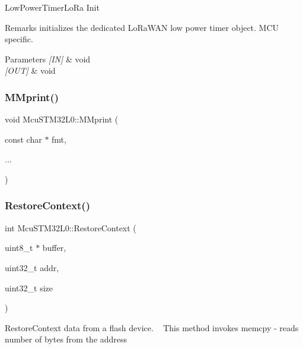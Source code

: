 Low\+Power\+Timer\+Lo\+Ra Init \begin{DoxyRemark}{Remarks}
initializes the dedicated Lo\+Ra\+W\+AN low power timer object. M\+CU specific. 
\end{DoxyRemark}

\begin{DoxyParams}{Parameters}
{\em \mbox{[}\+I\+N\mbox{]}} & void \\
\hline
{\em \mbox{[}\+O\+U\+T\mbox{]}} & void \\
\hline
\end{DoxyParams}
\mbox{\label{class_mcu_s_t_m32_l0_a23c56a6c3f82d731a344793288b2c998}} 
\subsubsection{\texorpdfstring{M\+Mprint()}{MMprint()}}
{\footnotesize\ttfamily void Mcu\+S\+T\+M32\+L0\+::\+M\+Mprint (\begin{DoxyParamCaption}\item[{const char $\ast$}]{fmt,  }\item[{}]{... }\end{DoxyParamCaption})}

\mbox{\label{class_mcu_s_t_m32_l0_a96a84f57ee2a60edb900505b8c23cf19}} 
\subsubsection{\texorpdfstring{Restore\+Context()}{RestoreContext()}}
{\footnotesize\ttfamily int Mcu\+S\+T\+M32\+L0\+::\+Restore\+Context (\begin{DoxyParamCaption}\item[{uint8\+\_\+t $\ast$}]{buffer,  }\item[{uint32\+\_\+t}]{addr,  }\item[{uint32\+\_\+t}]{size }\end{DoxyParamCaption})\hspace{0.3cm}{\ttfamily [inline]}}

Restore\+Context data from a flash device. ~\newline
 This method invokes memcpy -\/ reads number of bytes from the address


